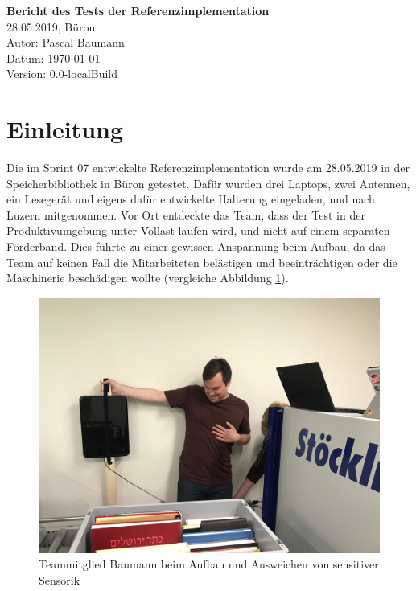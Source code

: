 \documentclass[parskip=full, a4paper]{scrartcl}
\providecommand{\docversion}{0.0-localBuild}
\begin{document}
\begin{titlepage}
\vspace*{2.5cm}
\noindent
\Huge{\textbf{Bericht des Tests der Referenzimplementation}} \\
\noindent
\Large{28.05.2019, Büron}\\
\vfill
\noindent
\large{Autor: Pascal Baumann}\\
\noindent
\large{Datum: \today}\\
\noindent
\large{Version: \docversion}\\
\end{titlepage}

\tableofcontents
\clearpage

\section{Einleitung}
Die im Sprint 07 entwickelte Referenzimplementation wurde am 28.05.2019 in der Speicherbibliothek in Büron getestet. Dafür wurden drei Laptops, zwei Antennen, ein Lesegerät und eigens dafür entwickelte Halterung eingeladen, und nach Luzern mitgenommen. Vor Ort entdeckte das Team, dass der Test in der Produktivumgebung unter Vollast laufen wird, und nicht auf einem separaten Förderband. Dies führte zu einer gewissen Anspannung beim Aufbau, da das Team auf keinen Fall die Mitarbeiteten belästigen und beeinträchtigen oder die Maschinerie beschädigen wollte (vergleiche Abbildung \ref{fig:AufbauSensorik}).

\begin{figure}[htb]
	\centering
	\includegraphics[keepaspectratio,width=\textwidth]{img/Testaufbau.jpg}
	\caption{Teammitglied Baumann beim Aufbau und Ausweichen von sensitiver Sensorik}
	\label{fig:AufbauSensorik}
\end{figure}
\end{document}

